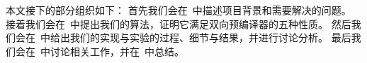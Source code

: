本文接下的部分组织如下：
首先我们会在~中描述项目背景和需要解决的问题。
接着我们会在~中提出我们的算法，证明它满足双向预编译器的五种性质。
然后我们会在~中给出我们的实现与实验的过程、细节与结果，并进行讨论分析。
最后我们会在~中讨论相关工作，并在~中总结。



